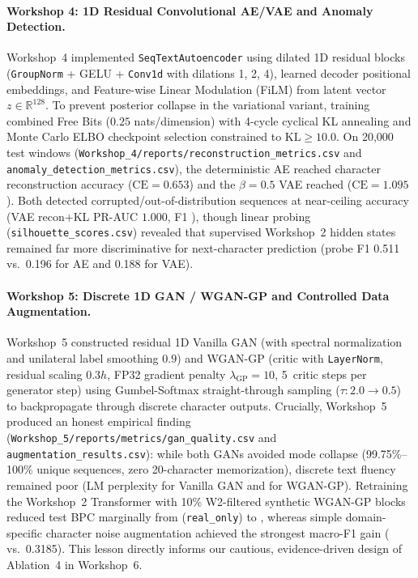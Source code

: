 \paragraph{Workshop 4: 1D Residual Convolutional AE/VAE and Anomaly Detection.}
Workshop~4 implemented \texttt{SeqTextAutoencoder} using dilated 1D residual blocks (\texttt{GroupNorm} + GELU + \texttt{Conv1d} with dilations 1, 2, 4), learned decoder positional embeddings, and Feature-wise Linear Modulation (FiLM) from latent vector $z \in \mathbb{R}^{128}$. To prevent posterior collapse in the variational variant, training combined Free Bits ($0.25$ nats/dimension) with 4-cycle cyclical KL annealing and Monte Carlo ELBO checkpoint selection constrained to $\mathrm{KL} \ge 10.0$. On 20,000 test windows (\texttt{Workshop\_4/reports/reconstruction\_metrics.csv} and \texttt{anomaly\_detection\_metrics.csv}), the deterministic AE reached \WFourAEAcc{} character reconstruction accuracy ($\mathrm{CE}=0.653$) and the $\beta=0.5$ VAE reached \WFourVAEAcc{} ($\mathrm{CE}=1.095$). Both detected corrupted/out-of-distribution sequences at near-ceiling accuracy (VAE recon+KL PR-AUC $1.000$, F1 \WFourVAEAnomFOne{}), though linear probing (\texttt{silhouette\_scores.csv}) revealed that supervised Workshop~2 hidden states remained far more discriminative for next-character prediction (probe F1 0.511 vs.\ 0.196 for AE and 0.188 for VAE).

\paragraph{Workshop 5: Discrete 1D GAN / WGAN-GP and Controlled Data Augmentation.}
Workshop~5 constructed residual 1D Vanilla GAN (with spectral normalization and unilateral label smoothing $0.9$) and WGAN-GP (critic with \texttt{LayerNorm}, residual scaling $0.3h$, FP32 gradient penalty $\lambda_{\mathrm{GP}}=10$, 5~critic steps per generator step) using Gumbel-Softmax straight-through sampling ($\tau: 2.0 \to 0.5$) to backpropagate through discrete character outputs. Crucially, Workshop~5 produced an honest empirical finding (\texttt{Workshop\_5/reports/metrics/gan\_quality.csv} and \texttt{augmentation\_results.csv}): while both GANs avoided mode collapse (99.75\%--100\% unique sequences, zero 20-character memorization), discrete text fluency remained poor (LM perplexity \WFiveVanillaPPL{} for Vanilla GAN and \WFiveWGANPPL{} for WGAN-GP). Retraining the Workshop~2 Transformer with 10\% W2-filtered synthetic WGAN-GP blocks reduced test BPC marginally from \WFiveRealBPC{} (\texttt{real\_only}) to \WFiveWGANBPC{}, whereas simple domain-specific character noise augmentation achieved the strongest macro-F1 gain (\WFiveNoiseFOne{} vs.\ 0.3185). This lesson directly informs our cautious, evidence-driven design of Ablation~4 in Workshop~6.
